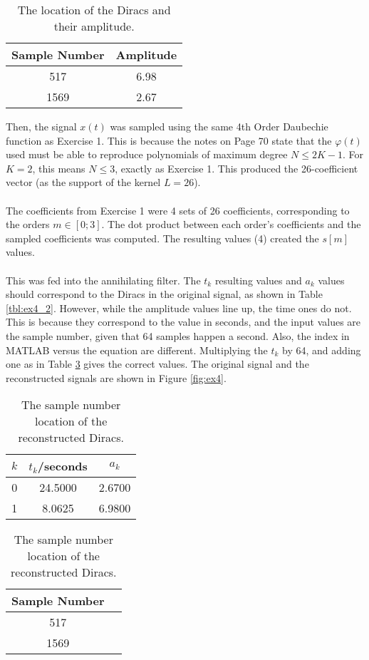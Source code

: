 \documentclass[11pt,a4paper]{report}
\begin{document}
\begin{table}[!ht]
    \centering
    \begin{tabular}{|c|c|}
        \hline
        \textbf{Sample Number} & \textbf{Amplitude} \\ \hline
        517                    & 6.98 \\ \hline
        1569                   & 2.67 \\ \hline
    \end{tabular}
    \caption{The location of the Diracs and their amplitude.}
    \label{tbl:ex4_1}
\end{table}

Then, the signal $x(t)$ was sampled using the same 4th Order Daubechie function as Exercise 1. This is because the notes \cite{notes} on Page 70 state that the $\varphi(t)$ used must be able to reproduce polynomials of maximum degree $N \leq 2K -1$. For $K=2$, this means $N \leq 3$, exactly as Exercise 1. This produced the 26-coefficient vector (as the support of the kernel $L = 26$).
\\\\
The coefficients from Exercise 1 were 4 sets of 26 coefficients, corresponding to the orders $m \in [0;3]$. The dot product between each order's coefficients and the sampled coefficients was computed. The resulting values (4) created the $s[m]$ values.
\\\\
This was fed into the annihilating filter. The $t_k$ resulting values and $a_k$ values should correspond to the Diracs in the original signal, as shown in Table \ref{tbl:ex4_2}. However, while the amplitude values line up, the time ones do not. This is because they correspond to the value in seconds, and the input values are the sample number, given that 64 samples happen a second. Also, the index in MATLAB versus the equation are different. Multiplying the $t_k$ by 64, and adding one as in Table \ref{tbl:ex4_3} gives the correct values. The original signal and the reconstructed signals are shown in Figure \ref{fig:ex4}.

\begin{table}[!ht]
    \parbox{.45\linewidth}{
    \centering
    \begin{tabular}{|c|c|c|}
        \hline
        $k$     & $t_k$/seconds     & $a_k$ \\ \hline
        0       & 24.5000   & 2.6700\\ \hline
        1       & 8.0625   & 6.9800\\ \hline
    \end{tabular}
    \caption{Results of the annihilating filter: location and amplitude of Diracs.}
    \label{tbl:ex4_2}
    }
    \hfill
    \parbox{.45\linewidth}{
    \centering
    \begin{tabular}{|c|c|}
        \hline
        \textbf{Sample Number} \\ \hline
        517   \\ \hline
        1569  \\ \hline
    \end{tabular}
    \caption{The sample number location of the reconstructed Diracs.}
    \label{tbl:ex4_3}
    }
\end{table}
\end{document}
